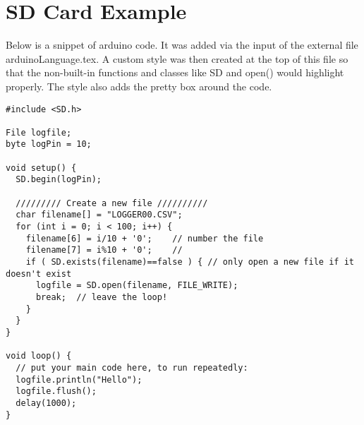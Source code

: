 \documentclass[12pt]{article} %
\begin{document}
\section{SD Card Example}
Below is a snippet of arduino code.  It was added  via the input of the external
 file arduinoLanguage.tex.  A custom style was then created at the top of this
 file so that the non-built-in functions and classes like SD and open() would highlight
 properly.  The style also adds the pretty box around the code.\\

\begin{lstlisting}[style=myArduino]
#include <SD.h>

File logfile;
byte logPin = 10;

void setup() {
  SD.begin(logPin);

  ///////// Create a new file //////////
  char filename[] = "LOGGER00.CSV";
  for (int i = 0; i < 100; i++) {
    filename[6] = i/10 + '0';    // number the file
    filename[7] = i%10 + '0';    //
    if ( SD.exists(filename)==false ) { // only open a new file if it doesn't exist
      logfile = SD.open(filename, FILE_WRITE); 
      break;  // leave the loop!
    }
  }
}

void loop() {
  // put your main code here, to run repeatedly:
  logfile.println("Hello");
  logfile.flush();
  delay(1000);
}
\end{lstlisting}
\end{document}
